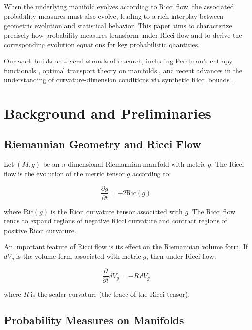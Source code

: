 \documentclass[12pt,a4paper]{article}
\begin{document}
When the underlying manifold evolves according to Ricci flow, the associated probability measures must also evolve, leading to a rich interplay between geometric evolution and statistical behavior. This paper aims to characterize precisely how probability measures transform under Ricci flow and to derive the corresponding evolution equations for key probabilistic quantities.

Our work builds on several strands of research, including Perelman's entropy functionals \cite{perelman2002entropy}, optimal transport theory on manifolds \cite{villani2009optimal}, and recent advances in the understanding of curvature-dimension conditions via synthetic Ricci bounds \cite{sturm2006geometry}.

\section{Background and Preliminaries}

\subsection{Riemannian Geometry and Ricci Flow}

Let $(M, g)$ be an $n$-dimensional Riemannian manifold with metric $g$. The Ricci flow is the evolution of the metric tensor $g$ according to:

\begin{equation}
\frac{\partial g}{\partial t} = -2\text{Ric}(g)
\end{equation}

\noindent where $\text{Ric}(g)$ is the Ricci curvature tensor associated with $g$. The Ricci flow tends to expand regions of negative Ricci curvature and contract regions of positive Ricci curvature.

An important feature of Ricci flow is its effect on the Riemannian volume form. If $dV_g$ is the volume form associated with metric $g$, then under Ricci flow:

\begin{equation}
\frac{\partial}{\partial t}dV_g = -R \, dV_g
\end{equation}

\noindent where $R$ is the scalar curvature (the trace of the Ricci tensor).

\subsection{Probability Measures on Manifolds}
\end{document}
